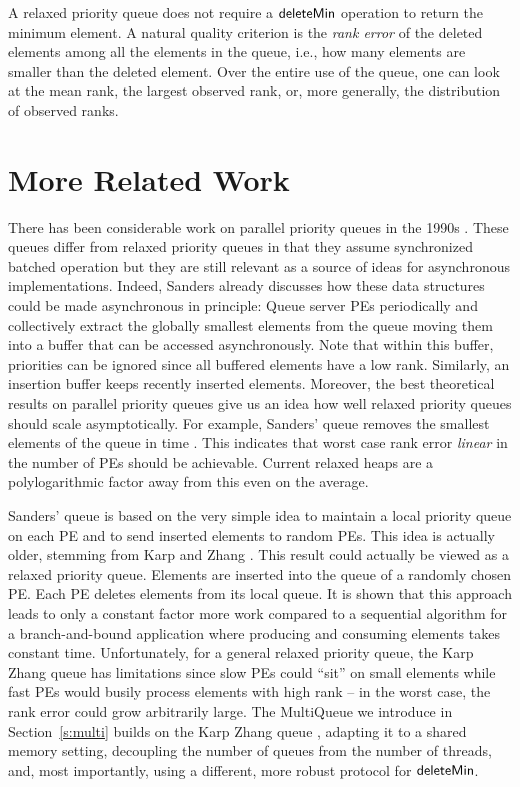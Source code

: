 \documentclass[a4paper,12pt]{article}
\newcommand{\Id}[1]{\ensuremath{\text{{\sf #1}}}}
\begin{document}
A relaxed priority queue does not require a \Id{deleteMin} operation to return the minimum element. A natural quality criterion is the \emph{rank error} of the deleted elements among all the elements in the queue, i.e., how many elements are smaller than the deleted element. Over the entire use of the queue, one can look at the mean rank, the largest observed rank, or, more generally, the distribution of observed ranks.

\section{More Related Work}
\label{s:related}

There has been considerable work on parallel priority queues in the 1990s \cite{DeoPra92,RanEtAl94,San98a}. 
These queues differ from relaxed priority queues in that they assume synchronized batched operation but they are still relevant as a source of ideas for asynchronous implementations. Indeed, Sanders \cite{San98a} already discusses how these data structures could be made asynchronous in principle: Queue server PEs periodically and collectively extract the globally smallest elements from the queue moving them into a buffer that can be accessed asynchronously. Note that within this buffer, priorities can be ignored since all buffered elements have a low rank. Similarly, an insertion buffer keeps recently inserted elements.
Moreover, the best theoretical  results on parallel priority queues give us an idea how well relaxed priority queues should scale asymptotically. For example, Sanders' queue \cite{San98a} removes the  smallest elements of the queue in time . This indicates that worst case rank error \emph{linear} in the number of PEs should be achievable. Current relaxed heaps are a polylogarithmic factor away from this even on the average.

Sanders' queue \cite{San98a} is based on the very simple idea to maintain a local priority queue on each PE and to send inserted elements to random PEs. This idea is actually older, stemming from Karp and Zhang \cite{KarZha93}.
This result could actually be viewed as a relaxed priority queue. Elements are inserted into the queue of a randomly chosen PE. Each PE deletes elements from its local queue. It is shown that this approach leads to only a constant factor more work compared to a sequential algorithm for a branch-and-bound application 
where producing and consuming elements takes constant time. Unfortunately, for a general relaxed priority queue, the Karp Zhang queue \cite{KarZha93} has limitations since slow PEs could ``sit'' on small elements while fast PEs would busily process elements with high rank -- in the worst case, the rank error could grow arbitrarily large.
The MultiQueue we introduce in Section~\ref{s:multi} builds on the Karp Zhang queue \cite{KarZha93}, adapting it to a shared memory setting, decoupling the number of queues from the number of threads, and, most importantly, using a different, more robust protocol for \Id{deleteMin}.
\end{document}
